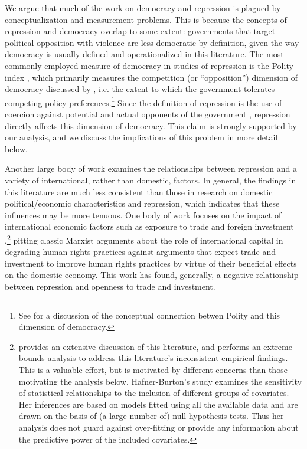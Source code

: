 \documentclass[12pt]{article}
\begin{document}
We argue that much of the work on democracy and repression is plagued by conceptualization and measurement problems. This is because the concepts of repression and democracy overlap to some extent: governments that target political opposition with violence are less democratic by definition, given the way democracy is usually defined and operationalized in this literature. The most commonly employed measure of democracy in studies of repression is the Polity index \citep{MarshallJaggers2009}, which primarily measures the competition (or ``opposition'') dimension of democracy discussed by \citet{Dahl1971}, i.e. the extent to which the government tolerates competing policy preferences.\footnote{See \citet{MunckVerkuilen2002} for a discussion of the conceptual connection betwen Polity and this dimension of democracy.} Since the definition of repression is the use of coercion against potential and actual opponents of the government \citep[See, e.g.][]{Davenport2007AR}, repression directly affects this dimension of democracy. This claim is strongly supported by our analysis, and we discuss the implications of this problem in more detail below. 

Another large body of  work examines the relationships between repression and a variety of international, rather than domestic, factors. In general, the findings in this literature are much less consistent than those in research on domestic political/economic characteristics and repression, which indicates that these influences may be more tenuous. One body of work focuses on the impact of international economic factors such as exposure to trade and foreign investment \citep{Apodaca2001, RichardsGellenySacko2001, HafnerBurton2005jpr},\footnote{\citet{HafnerBurton2005jpr} provides an extensive discussion of this literature, and performs an extreme bounds analysis \citep{LeamerLeonard1983} to address this literature's inconsistent empirical findings. This is a valuable effort, but is motivated by different concerns than those motivating the analysis below. Hafner-Burton's study examines the sensitivity of statistical relationships to the inclusion of different groups of covariates. Her inferences are based on models fitted using all the available data and are drawn on the basis of (a large number of) null hypothesis tests. Thus her analysis does not guard against over-fitting or provide any information about the predictive power of the included covariates.} pitting classic Marxist arguments about the role of international capital in degrading human rights practices against arguments that expect trade and investment to improve human rights practices by virtue of their beneficial effects on the domestic economy. This work has found, generally, a negative relationship between repression and openness to trade and investment.  
\end{document}
